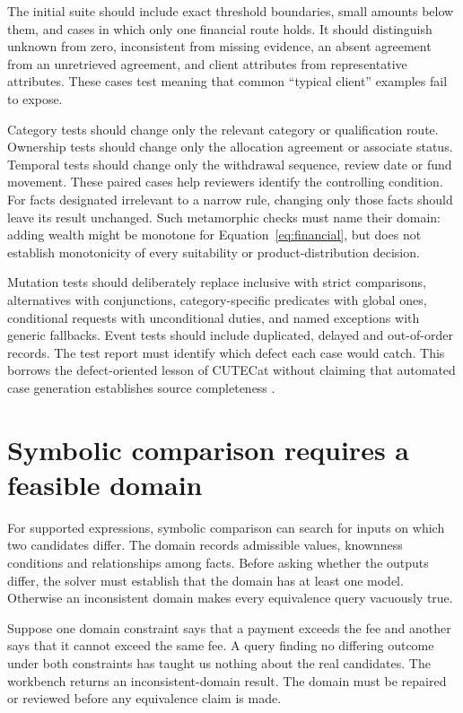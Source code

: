 \documentclass[12pt,a4paper,oneside,openany]{book}
\begin{document}
The initial suite should include exact threshold boundaries, small amounts below
them, and cases in which only one financial route holds. It should distinguish
unknown from zero, inconsistent from missing evidence, an absent agreement from
an unretrieved agreement, and client attributes from representative attributes.
These cases test meaning that common ``typical client'' examples fail to expose.

Category tests should change only the relevant category or qualification route.
Ownership tests should change only the allocation agreement or associate status.
Temporal tests should change only the withdrawal sequence, review date or fund
movement. These paired cases help reviewers identify the controlling condition.
For facts designated irrelevant to a narrow rule, changing only those facts should
leave its result unchanged. Such metamorphic checks must name their domain:
adding wealth might be monotone for Equation~\eqref{eq:financial}, but does not
establish monotonicity of every suitability or product-distribution decision.

Mutation tests should deliberately replace inclusive with strict comparisons,
alternatives with conjunctions, category-specific predicates with global ones,
conditional requests with unconditional duties, and named exceptions with generic
fallbacks. Event tests should include duplicated, delayed and out-of-order records.
The test report must identify which defect each case would catch. This borrows
the defect-oriented lesson of CUTECat without claiming that automated case
generation establishes source completeness \citep{cutecat2025}.

\section{Symbolic comparison requires a feasible domain}
\label{merge:M07:07}


For supported expressions, symbolic comparison can search for inputs on which two
candidates differ. The domain records admissible values, knownness conditions and
relationships among facts. Before asking whether the outputs differ, the solver
must establish that the domain has at least one model. Otherwise an inconsistent
domain makes every equivalence query vacuously true.

Suppose one domain constraint says that a payment exceeds the fee and another
says that it cannot exceed the same fee. A query finding no differing outcome
under both constraints has taught us nothing about the real candidates. The
workbench returns an inconsistent-domain result. The domain must be repaired or
reviewed before any equivalence claim is made.
\end{document}
